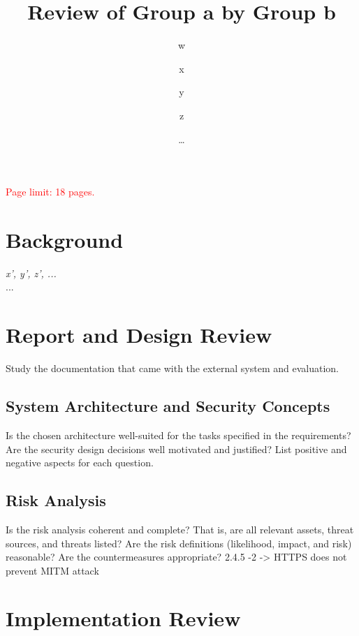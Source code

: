 \documentclass[english]{article}
\title{\huge\sffamily\bfseries Review of Group a by Group b}
\author{ w \and x \and y \and z}
\date{\dots}
\begin{document}
\maketitle

\begin{center}
{\large\textcolor{red}{Page limit: 18 pages.}}
\end{center}

\tableofcontents
\pagebreak



\section{Background}

 {\it x', y', z', ...} \\

 ...


\section{Report and Design Review}

Study the documentation that came with the external system and evaluation. 

\subsection{System Architecture and Security Concepts}

Is the chosen architecture well-suited for the tasks specified in the requirements? Are the security design decisions well motivated and justified? List positive and negative aspects for each question.


\subsection{Risk Analysis}

Is the risk analysis coherent and complete? That is, are all relevant assets, threat sources, and threats listed? 
%
Are the risk definitions (likelihood, impact, and risk) reasonable?
%
Are the countermeasures appropriate?
2.4.5 -2 -> HTTPS does not prevent MITM attack

\section{Implementation Review}
 
\end{document}
